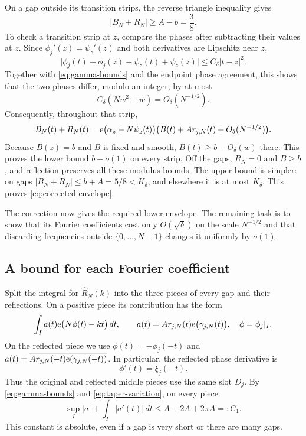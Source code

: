 On a gap outside its transition strips, the reverse triangle inequality
gives
\[
 |B_N+R_N|\ge A-b=\frac38.
\]
To check a transition strip at $z$, compare the phases after subtracting
their values at $z$.  Since $\phi_j'(z)=\psi_z'(z)$ and both derivatives
are Lipschitz near $z$,
\[
 \bigl|\phi_j(t)-\phi_j(z)-\psi_z(t)+\psi_z(z)\bigr|
       \le C_\delta|t-z|^2.
\]
Together with \eqref{eq:gamma-bounds} and the endpoint phase agreement,
this shows that the two phases differ, modulo an integer, by at most
\begin{equation}\label{eq:phase-strip-error}
 C_\delta(Nw^2+w)=O_\delta(N^{-1/2}).
\end{equation}
Consequently, throughout that strip,
\[
 B_N(t)+R_N(t)
 =\mathrm e\bigl(\alpha_z+N\psi_z(t)\bigr)
       \bigl(B(t)+A r_{j,N}(t)+O_\delta(N^{-1/2})\bigr).
\]
Because $B(z)=b$ and $B$ is fixed and smooth, $B(t)\ge b-O_\delta(w)$
there.  This proves the lower bound $b-o(1)$ on every strip.  Off the gaps,
$R_N=0$ and $B\ge b$, and reflection preserves all these modulus bounds.
The upper bound is simpler: on gaps $|B_N+R_N|\le b+A=5/8<K_\delta$,
and elsewhere it is at most $K_\delta$.  This proves
\eqref{eq:corrected-envelope}.

The correction now gives the required lower envelope.  The remaining
task is to show that its Fourier coefficients cost only $O(\sqrt\delta)$
on the scale $N^{-1/2}$ and that discarding frequencies outside
$\{0,\ldots,N-1\}$ changes it uniformly by $o(1)$.

\subsection{A bound for each Fourier coefficient}

Split the integral for $\widehat R_N(k)$ into the three pieces of every
gap and their reflections.  On a positive piece its contribution has
the form
\begin{equation}\label{eq:piece-integral}
 \int_I a(t)\mathrm e\bigl(N\phi(t)-kt\bigr)\,dt,
 \qquad a(t)=A r_{j,N}(t)\mathrm e\bigl(\gamma_{j,N}(t)\bigr),
 \quad \phi=\phi_j|_I.
\end{equation}
On the reflected piece we use
$\phi(t)=-\phi_j(-t)$ and
$a(t)=\overline{A r_{j,N}(-t)\mathrm e(\gamma_{j,N}(-t))}$.
In particular, the reflected phase derivative is
\begin{equation}\label{eq:reflected-derivative}
 \phi'(t)=\xi_j(-t).
\end{equation}
Thus the original and reflected middle pieces use the same slot $D_j$.
By \eqref{eq:gamma-bounds} and \eqref{eq:taper-variation}, on every piece
\begin{equation}\label{eq:amplitude-bv}
 \sup_I|a|+\int_I|a'(t)|\,dt
 \le A+2A+2\pi A=:C_1.
\end{equation}
This constant is absolute, even if a gap is very short or there are many
gaps.

